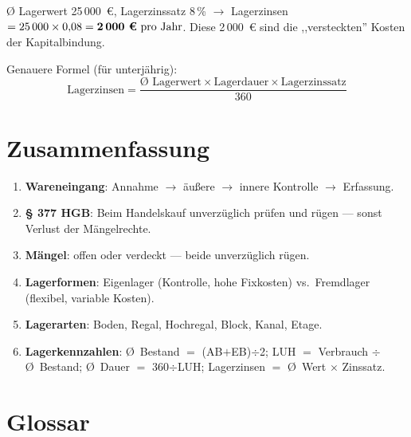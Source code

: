 \documentclass[11pt, a4paper]{article}
\begin{document}
\begin{beispiel}
Ø Lagerwert 25\,000~€, Lagerzinssatz 8\,\% $\to$ Lagerzinsen $= 25\,000 \times 0{,}08 = \textbf{2\,000 €} \text{ pro Jahr}$. Diese 2\,000~€ sind die ,,versteckten'' Kosten der Kapitalbindung.
\end{beispiel}

Genauere Formel (für unterjährig):
\[
\text{Lagerzinsen} = \frac{\text{Ø Lagerwert} \times \text{Lagerdauer} \times \text{Lagerzinssatz}}{360}
\]

\section{Zusammenfassung}

\begin{enumerate}
  \item \textbf{Wareneingang}: Annahme $\to$ äußere $\to$ innere Kontrolle $\to$ Erfassung.
  \item \textbf{§ 377 HGB}: Beim Handelskauf unverzüglich prüfen und rügen --- sonst Verlust der Mängelrechte.
  \item \textbf{Mängel}: offen oder verdeckt --- beide unverzüglich rügen.
  \item \textbf{Lagerformen}: Eigenlager (Kontrolle, hohe Fixkosten) vs.\ Fremdlager (flexibel, variable Kosten).
  \item \textbf{Lagerarten}: Boden, Regal, Hochregal, Block, Kanal, Etage.
  \item \textbf{Lagerkennzahlen}: Ø~Bestand $=$ (AB$+$EB)$\div$2; LUH $=$ Verbrauch $\div$ Ø~Bestand; Ø~Dauer $=$ 360$\div$LUH; Lagerzinsen $=$ Ø~Wert $\times$ Zinssatz.
\end{enumerate}

\newpage

\section*{Glossar}



\end{document}
